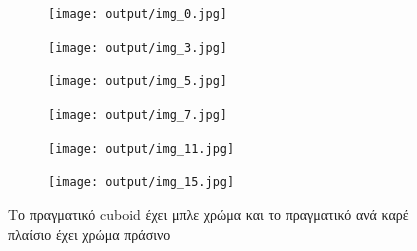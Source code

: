 \begin{figure}[h]
  \centering
  \begin{subfigure}{0.15\textwidth}
    \texttt{[image: output/img\_0.jpg]}
  \end{subfigure}
  \begin{subfigure}{0.15\textwidth}
    \texttt{[image: output/img\_3.jpg]}
  \end{subfigure}
  \begin{subfigure}{0.15\textwidth}
    \texttt{[image: output/img\_5.jpg]}
  \end{subfigure}
  \begin{subfigure}{0.15\textwidth}
    \texttt{[image: output/img\_7.jpg]}
  \end{subfigure}
  \begin{subfigure}{0.15\textwidth}
    \texttt{[image: output/img\_11.jpg]}
  \end{subfigure}
  \begin{subfigure}{0.15\textwidth}
    \texttt{[image: output/img\_15.jpg]}
  \end{subfigure}
  
  \caption{\gr Το πραγματικό \en cuboid \gr έχει μπλε χρώμα και το πραγματικό ανά καρέ πλαίσιο έχει χρώμα πράσινο}
  \label{fig:gr_gt_tubes_and_rois}
\end{figure}


